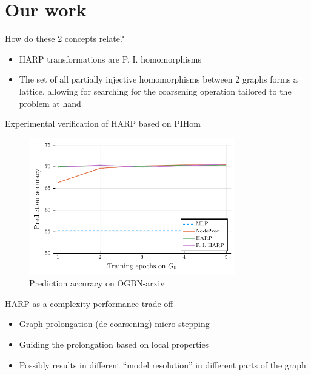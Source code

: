 \documentclass[10pt]{beamer}
\begin{document}
\section{Our work}

\begin{frame}{How do these 2 concepts relate?}
	\begin{itemize}
		\item HARP transformations are P. I. homomorphisms
		\item The set of all partially injective homomorphisms between 2 graphs forms a lattice, allowing for searching for the coarsening operation tailored to the problem at hand
	\end{itemize}
\end{frame}

\begin{frame}{Experimental verification of HARP based on PIHom}
	\begin{figure}
		\centering
		\includegraphics[width=0.8\textwidth]{images/pihom_comparison/pihom_comparison.pdf}
		\caption{Prediction accuracy on OGBN-arxiv}
	\end{figure}
\end{frame}

\begin{frame}{HARP as a complexity-performance trade-off}
	\begin{itemize}
		\item Graph prolongation (de-coarsening) micro-stepping
		\item Guiding the prolongation based on local properties
		\item Possibly results in different \enquote{model resolution} in different parts of the graph
	\end{itemize}
\end{frame}
\end{document}
